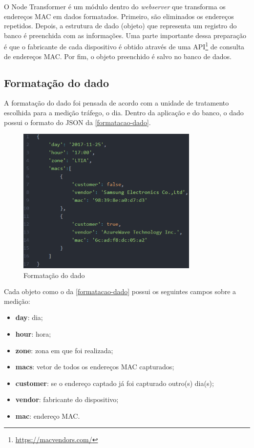 O Node Transformer é um módulo dentro do \emph{webserver}
que transforma os endereços MAC em dados formatados.
Primeiro, são eliminados os endereços repetidos. Depois, a estrutura de dado (objeto)
que representa um registro do banco é preenchida com as informações. Uma parte importante dessa preparação
é que o fabricante de cada dispositivo é obtido através de uma API\footnote{\url{https://macvendors.com/}} de consulta de endereços MAC. Por fim,
o objeto preenchido é salvo no banco de dados.

\subsection{Formatação do dado}
A formatação do dado foi pensada de acordo com a unidade de tratamento escolhida para a medição tráfego, o dia.
Dentro da aplicação e do banco, o dado possui o formato do JSON da \autoref{formatacao-dado}.

\begin{figure}[!h]
  \caption{\label{formatacao-dado}Formatação do dado}
  \begin{center}
    \includegraphics[width=0.8\textwidth]{img/formato-dado.png}
  \end{center}
\end{figure}

Cada objeto como o da \autoref{formatacao-dado} possui os seguintes campos sobre a medição:
\begin{itemize}
    \item \textbf{day}: dia;
    \item \textbf{hour}: hora;
    \item \textbf{zone}: zona em que foi realizada;
    \item \textbf{macs}: vetor de todos os endereços MAC capturados;
    \item \textbf{customer}: se o endereço captado já foi capturado outro(s) dia(s);
    \item \textbf{vendor}: fabricante do dispositivo;
    \item \textbf{mac}: endereço MAC.
\end{itemize}

